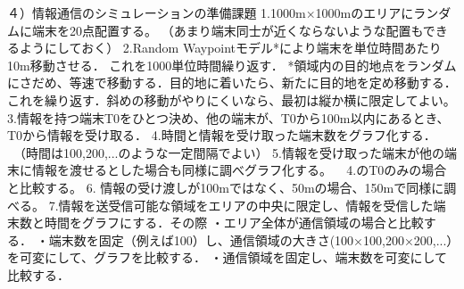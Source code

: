 ４）情報通信のシミュレーションの準備課題
1.1000m×1000mのエリアにランダムに端末を20点配置する。
（あまり端末同士が近くならないような配置もできるようにしておく）
2.Random Waypointモデル*により端末を単位時間あたり10m移動させる．
これを1000単位時間繰り返す．
*領域内の目的地点をランダムにさだめ、等速で移動する．目的地に着いたら、新たに目的地を定め移動する．これを繰り返す．斜めの移動がやりにくいなら、最初は縦か横に限定してよい。
3.情報を持つ端末T0をひとつ決め、他の端末が、T0から100m以内にあるとき、T0から情報を受け取る．
4.時間と情報を受け取った端末数をグラフ化する．
　（時間は100,200,...のような一定間隔でよい）
5.情報を受け取った端末が他の端末に情報を渡せるとした場合も同様に調べグラフ化する。
  4.のT0のみの場合と比較する。
6. 情報の受け渡しが100mではなく、50mの場合、150mで同様に調べる。
7.情報を送受信可能な領域をエリアの中央に限定し、情報を受信した端末数と時間をグラフにする．その際
・エリア全体が通信領域の場合と比較する．
・端末数を固定（例えば100）し、通信領域の大きさ(100×100,200×200,...）を可変にして、グラフを比較する．
・通信領域を固定し、端末数を可変にして比較する． 